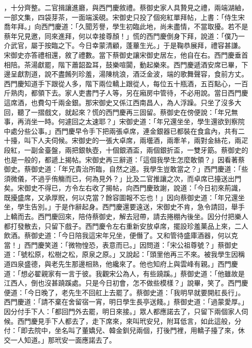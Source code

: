 \begin{showcontents}{}
，十分齊整。二官揖讓進廳，與西門慶敘禮。蔡御史家人具贄見之禮，兩端湖紬，一部文集，四袋芽茶，一面端溪硯。宋御史只投了個宛紅單拜帖，上書：「侍生宋喬年拜。」向西門慶道：「久聞芳譽，學生初臨此地，尚未盡情，不當取擾。若不是蔡年兄見邀，同來進拜，何以幸接尊顏！」慌的西門慶倒身下拜，說道：「僕乃一介武官，屬于按臨之下。今日幸蒙清顧，蓬蓽生光。」于是鞠恭展拜，禮容甚謙。宋御史亦答禮相還，敘了禮數。當下蔡御史讓宋御史居左，他自在右。西門慶垂首相陪。茶湯獻罷，階下蕭韶盈耳，鼓樂喧闐，動起樂來。西門慶遞酒安席已畢，下邊呈獻割道，說不盡餚列珍羞，湯陳桃浪，酒泛金波，端的歌舞聲容，食前方丈。西門慶知道手下跟從人多，階下兩位轎上跟從人，每位五十瓶酒，五百點心，一百斤熟肉，都領下去。家人吏書門子人等，另在廂房中管待，不必用說。當日西門慶這席酒，也費勾千兩金銀。那宋御史又係江西南昌人，為人浮躁。只坐了沒多大回，聽了一摺戲文，就起來？慌的西門慶再三固留。蔡御史在傍便說：「年兄無事，再消坐一時。何遽回之太速耶？」宋御史道：「年兄還坐坐，學生還欲到察院中處分些公事。」西門慶早令手下把兩張卓席，連金銀器已都裝在食盒內，共有二十擡，叫下人夫伺候。宋御史的一張大卓席，兩壜酒，兩牽羊，兩對金絲花，兩疋段紅，一副金臺盤，兩把銀執壺，十個銀酒盃，兩個銀折盃，一雙牙筯。蔡御史的也是一般的，都遞上揭帖。宋御史再三辭道：「這個我學生怎麼敢領？」因看著蔡御史。蔡御史道：「年兄貴治所臨，自然之道。我學生豈敢當之？」西門慶道：「些須微儀，不過乎侑觴而已，何為見外？」比及二官推讓之次，而卓席已擡送出門矣。宋御史不得已，方令左右收了揭帖，向西門慶致謝，說道：「今日初來荊識，既擾盛席，又承厚貺，何以克當？餘容圖報不忘也！」因向蔡御史道：「年兄還坐坐，學生告別。」于是作辭起身。西門慶還要遠送，宋御史不肯，急令請回，舉手上轎而去。西門慶回來，陪侍蔡御史，解去冠帶，請去捲棚內後坐。因分付把樂人都打發散去，只留下戲子。西門慶令左右重新安放卓席，擺設珍羞菓品上來，二人飲酒。蔡御史道：「今日陪我這宋年兄坐，便僭了。又和管待盛庫酒器，何以克當！」西門慶笑道：「微物惶恐，表意而已。」因問道：「宋公祖尊號？」蔡御史道：「號松原，松樹之松，原泉之原。」又說起：「頭里他再三不來。被我學生因稱道四泉盛德，與老先生那邊相熟，他纔來了。他也知府上與雲峰有親。」西門慶道：「想必翟親家有一言于彼。我觀宋公為人，有些蹺蹊。」蔡御史道：「他雖故是江西人，倒也沒甚蹺蹊處。只是今日初會，怎不做些模樣？」說畢，笑了。西門慶便道：「今日晚了，老先生不回舡上去罷了。蔡御史道：「我明早就要開舡長行」。西門慶道：「請不棄在舍留宿一宵，明日學生長亭送餞。」蔡御史道：「過蒙愛厚。」因分付手下人：「都回門外去罷，明日來接。」眾人都應諾去了，只留下兩個家人伺候。西門慶見手下人都去了，走下席來，來叫玳安兒，附耳低言，如此這般，分付：「即去院中，坐名叫了董嬌兒、韓金釧兒兩個，打後門裡，用轎子擡了來，休交一人知道。」那玳安一面應諾去了。


\end{showcontents}
